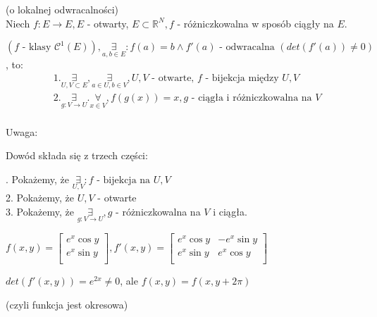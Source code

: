 \documentclass[../main.tex]{subfiles}
\begin{document}
\begin{tw}
    (o lokalnej odwracalności)\\

    Niech $f: E \to E, E$ - otwarty, $E\subset \mathbb{R}^N, f$ - różniczkowalna w sposób ciągły na $E$.

    $(f \text{ - klasy } \mathcal{C}^1 (E)), \underset{a,b\in E}{\exists}:f(a) = b \land f'(a) \text{ - odwracalna } (det(f'(a))\neq 0)$, to:
    \begin{align*}
        &1. \underset{U,V\subset E}{\exists}, \underset{a\in U, b\in V}{\exists}, U,V \text{ - otwarte, }f \text{ - bijekcja między } U,V\\
        &2. \underset{g: V\to U}{\exists}.\underset{x\in V}{\forall}, f(g(x)) = x, g\text{ - ciągła i różniczkowalna na } V\\
    \end{align*}
\end{tw}


\begin{large}
Uwaga:
\end{large}
Dowód składa się z trzech części:
\vspace{0.5cm}

. Pokażemy, że $\underset{U,V}{\exists}: f \text{ - bijekcja na }U,V$\\
2. Pokażemy, że $U,V$ - otwarte\\
3. Pokażemy, że $\underset{g: V\to U}{\exists}, g$ - różniczkowalna na $V$ i ciągła.

\begin{przyklad}

\end{przyklad}

$f(x,y) = \left [ \begin{matrix}
e^x \cos y\\
e^x \sin y\\ \end{matrix}\right ]
,
f'(x,y) = \left [ \begin{matrix}
e^x \cos y &-e^x \sin y\\
e^x \sin y &e^x \cos y\\
 \end{matrix}\right ] $

$det(f'(x,y)) = e^{2x} \neq 0$, ale $f(x,y) = f(x,y+2\pi)$
\begin{tiny}
(czyli funkcja jest okresowa)
\end{tiny}


\begin{dowod}

\end{dowod}
\end{document}
